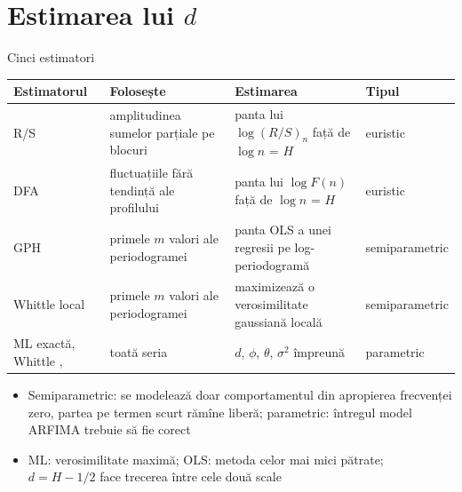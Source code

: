 \section{Estimarea lui $d$}

\begin{frame}{Cinci estimatori}
\itemsize{\small}
\begin{center}
\scriptsize
\begin{tabular}{>{\raggedright\arraybackslash}p{2.3cm}>{\raggedright\arraybackslash}p{3.1cm}>{\raggedright\arraybackslash}p{3.6cm}>{\raggedright\arraybackslash}p{1.9cm}}
\toprule
\textbf{Estimatorul} & \textbf{Folosește} & \textbf{Estimarea} & \textbf{Tipul} \\
\midrule
R/S {} & amplitudinea sumelor parțiale pe blocuri & panta lui $\log(R/S)_n$ față de $\log n$ = $H$ & euristic \\
DFA {} & fluctuațiile fără tendință ale profilului & panta lui $\log F(n)$ față de $\log n$ = $H$ & euristic \\
GPH {} & primele $m$ valori ale periodogramei & panta OLS a unei regresii pe log-periodogramă & semiparametric \\
Whittle local {} & primele $m$ valori ale periodogramei & maximizează o verosimilitate gaussiană locală & semiparametric \\
ML exactă, Whittle , {} & toată seria & $d$, $\phi$, $\theta$, $\sigma^2$ împreună & parametric \\
\bottomrule
\end{tabular}
\end{center}
\begin{itemize}
    \item Semiparametric: se modelează doar comportamentul din apropierea frecvenței zero, partea pe termen scurt rămîne liberă; parametric: întregul model ARFIMA trebuie să fie corect
    \item ML: verosimilitate maximă; OLS: metoda celor mai mici pătrate; $d = H - 1/2$ face trecerea între cele două scale
\end{itemize}
\end{frame}

